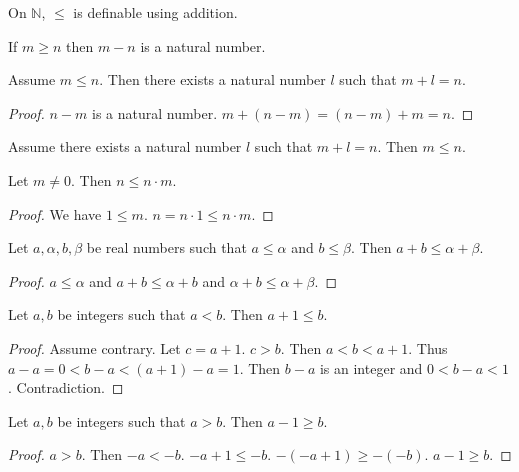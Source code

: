 \documentclass{article}
\begin{document}
%
On $\mathbb{N}$, $\leq$ is definable using addition.
%
\begin{forthel}
\begin{lemma}
If $m \geq n$ then $m-n$ is a natural number.
\end{lemma}

\begin{lemma}
Assume $m \leq n$. Then
there exists a natural number $l$ such that $m + l = n$.
\end{lemma}
\begin{proof}
$n - m$ is a natural number. $m + (n-m) = (n - m) + m = n$.
\end{proof}

\begin{lemma}
Assume there exists a natural number $l$ such 
that $m + l = n$. Then $m \leq n$.
\end{lemma}

\begin{lemma}
Let $m \neq 0$. Then $n \leq n \cdot m$.
\end{lemma}
\begin{proof}
We have $1 \leq m$. $n = n \cdot 1 \leq n \cdot m$.
\end{proof}

\begin{lemma}
Let $a,\alpha,b,\beta$ be real numbers such that $a \leq \alpha$ and $b \leq \beta$.
Then $a + b \leq \alpha + \beta$.
\end{lemma}
\begin{proof}
$a \leq \alpha$ and $a + b \leq \alpha + b$ and $\alpha + b \leq \alpha + \beta$.
\end{proof}

\begin{lemma}
Let $a,b$ be integers such that $a < b$.
Then $a + 1 \leq b$.
\end{lemma}
\begin{proof}
Assume contrary. Let $c = a+1$. $c>b$.
Then $a < b < a + 1$. Thus $a - a = 0 < b - a < (a + 1) - a = 1$. Then $b - a$ is an integer
and $0 < b - a < 1$. Contradiction.
\end{proof}

\begin{lemma}
Let $a,b$ be integers such that $a > b$.
Then $a - 1 \geq b$.
\end{lemma}
\begin{proof}
$a > b$. Then $-a < -b$. $-a + 1 \leq -b$. $-(-a + 1) \geq -(-b)$. $a - 1 \geq b$.
\end{proof}
\end{forthel}
\end{document}
